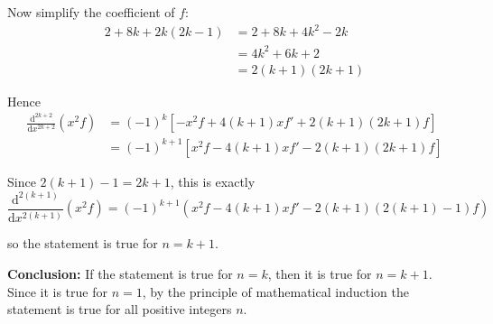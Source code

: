 \documentclass[leqno]{article}
\begin{document}
\begin{enumerate}[
  label=\textbf{\arabic*.},
  leftmargin=*,
  topsep=0pt,
  partopsep=0pt,
  parsep=0pt
]
\begin{djsSolution}
Now simplify the coefficient of \(f\):
\begin{align*}
2+8k+2k(2k-1)
&=2+8k+4k^2-2k
\\
&=4k^2+6k+2
\\
&=2(k+1)(2k+1)
\end{align*}

Hence
\begin{align*}
\frac{\mathrm{d}^{2k+2}}{\mathrm{d}x^{2k+2}}\left(x^2f\right)
&= (-1)^k\left[-x^2f+4(k+1)xf'+2(k+1)(2k+1)f\right]
\\
&= (-1)^{k+1}\left[x^2f-4(k+1)xf'-2(k+1)(2k+1)f\right]
\end{align*}

Since \(2(k+1)-1=2k+1\), this is exactly
\[
\frac{\mathrm{d}^{2(k+1)}}{\mathrm{d}x^{2(k+1)}}\left(x^2f\right)
=
(-1)^{k+1}\left(x^2f-4(k+1)xf'-2(k+1)(2(k+1)-1)f\right)
\]

so the statement is true for \(n=k+1\).

\textbf{Conclusion:} If the statement is true for \(n=k\), then it is true for \(n=k+1\). Since it is true for \(n=1\), by the principle of mathematical induction the statement is true for all positive integers \(n\).
\end{djsSolution}


\end{enumerate}
\end{document}
